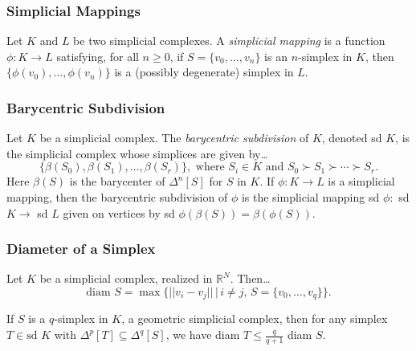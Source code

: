 \subsubsection{Simplicial Mappings}\label{simplicialmappings}
Let $K$ and $L$ be two simplicial complexes. A \emph{simplicial mapping} is a function $\phi: K \rightarrow L$ satisfying, for all $n \geq 0$,
if $S = \{ v_0, \dots, v_n \}$ is an $n$-simplex in $K$, then $\{ \phi(v_0),\dots,\phi(v_n) \}$ is a (possibly degenerate) simplex in $L$.

\subsubsection{Barycentric Subdivision}\label{barycentricsubdivision}
Let $K$ be a simplicial complex. The \emph{barycentric subdivision} of $K$, denoted sd $K$, is the simplicial complex whose simplices are given by\dots
$$\{ \beta(S_0), \beta(S_1), \dots, \beta(S_r) \}, \textrm{ where } S_i \in K \textrm{ and } S_0 \succ S_1 \succ \cdots \succ S_r.$$
Here $\beta(S)$ is the barycenter of $\Delta^n[S]$ for $S$ in $K$. If $\phi : K \rightarrow L$ is a simplicial mapping, then the barycentric subdivision of $\phi$
is the simplicial mapping sd $\phi:$ sd $K \rightarrow$ sd $L$ given on vertices by sd $\phi(\beta(S)) = \beta(\phi(S)).$

\subsubsection{Diameter of a Simplex}\label{diametersimplex}
Let $K$ be a simplicial complex, realized in $\mathbb{R}^N$. Then\dots
$$\textrm{diam }S = \max\{||v_i - v_j|| \, | \, i\neq j, \, S = \{v_0, \dots, v_q \} \}.$$

\begin{proposition}
If $S$ is a $q$-simplex in $K$, a geometric simplicial complex, then for any simplex $T \in \textrm{sd } K$ with $\Delta^p[T] \subseteq \Delta^q[S]$,
we have diam $T \leq \frac{q}{q+1}$ diam $S$.
\end{proposition}


